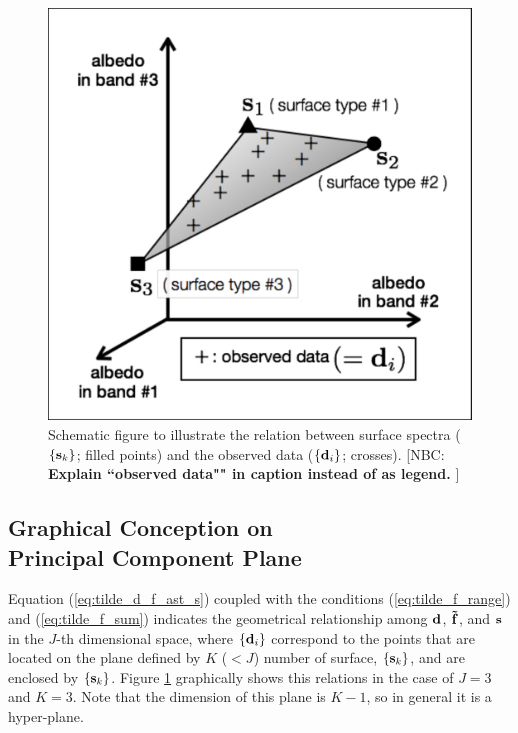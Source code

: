 \documentclass[iop,numberedappendix,apj,]{emulateapj}
\def\fast{\tilde f}
\def\memoYF#1{\color{red}[YF: {\bf #1}]\color{black}}
\def\memoNBC#1{\color{blue}[NBC: {\bf #1}]\color{black}}
\begin{document}
\begin{figure}[b!]
    \begin{center}
\includegraphics[width=\hsize]{schematics.pdf}
    \end{center}
    \caption{Schematic figure to illustrate the relation between surface spectra ($\{{\bf s}_k\} $; filled points) and the observed data ($\{{\bf d}_i\} $; crosses). \memoNBC{Explain ``observed data"" in caption instead of as legend. }}
\label{fig:schematic}
\end{figure}


\subsection{Graphical Conception on \\Principal Component Plane}
\label{ss:PCplane}


Equation (\ref{eq:tilde_d_f_ast_s}) coupled with the conditions (\ref{eq:tilde_f_range}) and (\ref{eq:tilde_f_sum}) indicates the geometrical relationship among ${\bf d}$, ${\bf \fast }$, and ${\bf s}$ in the $J$-th dimensional space, where $\{{\bf d}_i\}$ correspond to the points that are located on the plane defined by $K$ ($<J$) number of surface, $\{{\bf s}_k\} $, and are enclosed by $\{{\bf s}_k \}$. 
Figure \ref{fig:schematic} graphically shows this relations in the case of $J=3$ and $K=3$. 
Note that the dimension of this plane is $K-1$, so in general it is a hyper-plane.  
\end{document}
